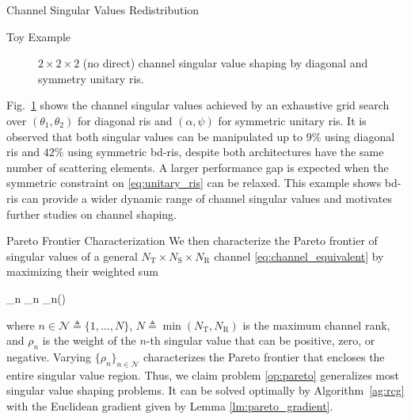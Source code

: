 \documentclass[journal]{IEEEtran}
\begin{document}
\begin{section}{Channel Singular Values Redistribution}
\begin{subsection}{Toy Example}
\begin{figure}
			\caption{$2 \times 2 \times 2$ (no direct) channel singular value shaping by diagonal and symmetry unitary \gls{ris}.}
			\label{fg:singular_trend}
		\end{figure}
		Fig.~\ref{fg:singular_trend} shows the channel singular values achieved by an exhaustive grid search over $(\theta_1, \theta_2)$ for diagonal \gls{ris} and $(\alpha, \psi)$ for symmetric unitary \gls{ris}.
		It is observed that both singular values can be manipulated up to $9\%$ using diagonal \gls{ris} and $42\%$ using symmetric \gls{bd}-\gls{ris}, despite both architectures have the same number of scattering elements.
		A larger performance gap is expected when the symmetric constraint on \eqref{eq:unitary_ris} can be relaxed.
		This example shows \gls{bd}-\gls{ris} can provide a wider dynamic range of channel singular values and motivates further studies on channel shaping.
	\end{subsection}

	\begin{subsection}{Pareto Frontier Characterization}\label{sc:pareto_frontier}
		We then characterize the Pareto frontier of singular values of a general $N_\mathrm{T} \times N_\mathrm{S} \times N_\mathrm{R}$ channel \eqref{eq:channel_equivalent} by maximizing their weighted sum
		\begin{maxi!}
			{\scriptstyle{\mathbf{\Theta}}}{\sum_n \rho_n \sigma_n()}{\label{op:pareto}}{\label{ob:pareto}}
		\end{maxi!}
		where $n \in \mathcal{N} \triangleq \{1,\ldots,N\}$, $N \triangleq \min(N_\mathrm{T}, N_\mathrm{R})$ is the maximum channel rank, and $\rho_n$ is the weight of the $n$-th singular value that can be positive, zero, or negative.
		Varying $\{\rho_n\}_{n \in \mathcal{N}}$ characterizes the Pareto frontier that encloses the entire singular value region.
		Thus, we claim problem \eqref{op:pareto} generalizes most singular value shaping problems.
		It can be solved optimally by Algorithm~\ref{ag:rcg} with the Euclidean gradient given by Lemma \ref{lm:pareto_gradient}.


\end{subsection}
\end{section}
\end{document}

